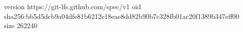version https://git-lfs.github.com/spec/v1
oid sha256:bb5d5dcb9a04dfe81b6212e18eae8dd82b90b7c328fb01ac20f1389b347eff00
size 262240
